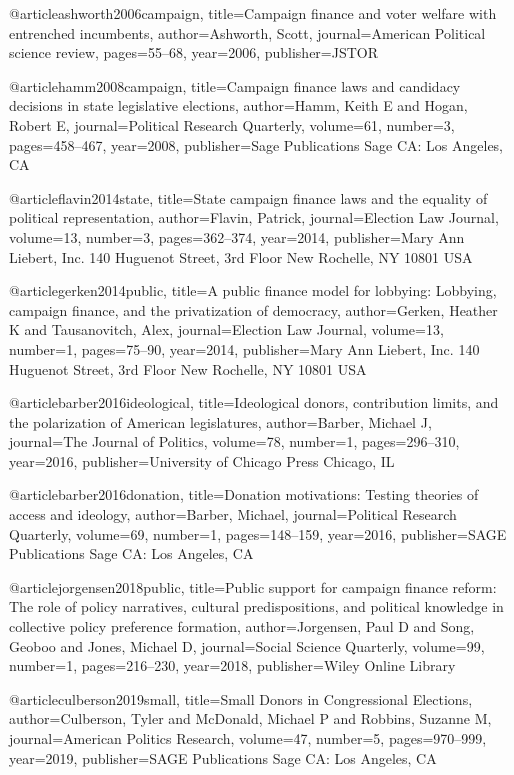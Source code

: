 @article{ashworth2006campaign,
  title={Campaign finance and voter welfare with entrenched incumbents},
  author={Ashworth, Scott},
  journal={American Political science review},
  pages={55--68},
  year={2006},
  publisher={JSTOR}
}

@article{hamm2008campaign,
  title={Campaign finance laws and candidacy decisions in state legislative elections},
  author={Hamm, Keith E and Hogan, Robert E},
  journal={Political Research Quarterly},
  volume={61},
  number={3},
  pages={458--467},
  year={2008},
  publisher={Sage Publications Sage CA: Los Angeles, CA}
}

@article{flavin2014state,
  title={State campaign finance laws and the equality of political representation},
  author={Flavin, Patrick},
  journal={Election Law Journal},
  volume={13},
  number={3},
  pages={362--374},
  year={2014},
  publisher={Mary Ann Liebert, Inc. 140 Huguenot Street, 3rd Floor New Rochelle, NY 10801 USA}
}

@article{gerken2014public,
  title={A public finance model for lobbying: Lobbying, campaign finance, and the privatization of democracy},
  author={Gerken, Heather K and Tausanovitch, Alex},
  journal={Election Law Journal},
  volume={13},
  number={1},
  pages={75--90},
  year={2014},
  publisher={Mary Ann Liebert, Inc. 140 Huguenot Street, 3rd Floor New Rochelle, NY 10801 USA}
}

@article{barber2016ideological,
  title={Ideological donors, contribution limits, and the polarization of American legislatures},
  author={Barber, Michael J},
  journal={The Journal of Politics},
  volume={78},
  number={1},
  pages={296--310},
  year={2016},
  publisher={University of Chicago Press Chicago, IL}
}

@article{barber2016donation,
  title={Donation motivations: Testing theories of access and ideology},
  author={Barber, Michael},
  journal={Political Research Quarterly},
  volume={69},
  number={1},
  pages={148--159},
  year={2016},
  publisher={SAGE Publications Sage CA: Los Angeles, CA}
}

@article{jorgensen2018public,
  title={Public support for campaign finance reform: The role of policy narratives, cultural predispositions, and political knowledge in collective policy preference formation},
  author={Jorgensen, Paul D and Song, Geoboo and Jones, Michael D},
  journal={Social Science Quarterly},
  volume={99},
  number={1},
  pages={216--230},
  year={2018},
  publisher={Wiley Online Library}
}

@article{culberson2019small,
  title={Small Donors in Congressional Elections},
  author={Culberson, Tyler and McDonald, Michael P and Robbins, Suzanne M},
  journal={American Politics Research},
  volume={47},
  number={5},
  pages={970--999},
  year={2019},
  publisher={SAGE Publications Sage CA: Los Angeles, CA}
}

